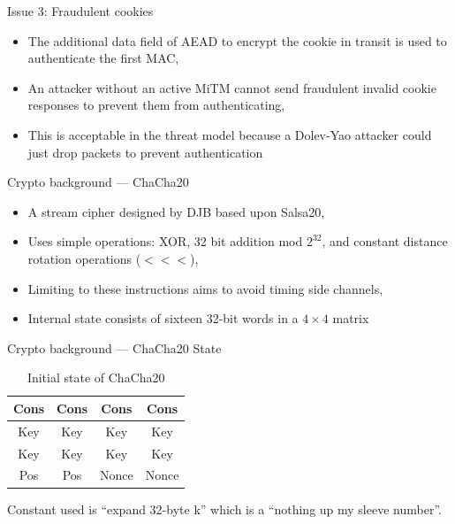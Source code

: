 \documentclass[xcolor=table]{beamer}
\begin{document}
    \begin{frame}{Issue 3: Fraudulent cookies}
    \begin{itemize}
        \item The additional data field of AEAD to encrypt the cookie in transit is used to authenticate the first MAC,
        \item An attacker without an active MiTM cannot send fraudulent invalid cookie responses to prevent them from authenticating,
        \item This is acceptable in the threat model because a Dolev-Yao attacker could just drop packets to prevent authentication
    \end{itemize}
    \end{frame}

    \begin{frame}{Crypto background --- ChaCha20}
        \begin{itemize}
            \item A stream cipher designed by DJB based upon Salsa20,
            \item Uses simple operations: XOR, 32 bit addition mod \(2^{32}\), and constant distance rotation operations (\(<<<\)),
            \item Limiting to these instructions aims to avoid timing side channels,
            \item Internal state consists of sixteen 32-bit words in a \(4 \times 4\) matrix
        \end{itemize}
    \end{frame}

    \begin{frame}{Crypto background --- ChaCha20 State}
        \begin{table}
        \begin{tabular}{|c|c|c|c|}
            \hline
            \rowcolor{yellow!25}Cons & Cons & Cons& Cons\\
            \hline
            \rowcolor{blue!25} Key & Key & Key & Key\\
            \hline
            \rowcolor{blue!25} Key & Key & Key & Key\\
            \hline
            \cellcolor{red!25} Pos & \cellcolor{red!25} Pos & \cellcolor{green!25} Nonce & \cellcolor{green!25} Nonce\\
            \hline
        \end{tabular}
        \caption{Initial state of ChaCha20}
        \end{table}

        Constant used is ``expand 32-byte k'' which is a ``nothing up my sleeve number''.
    \end{frame}
\end{document}
